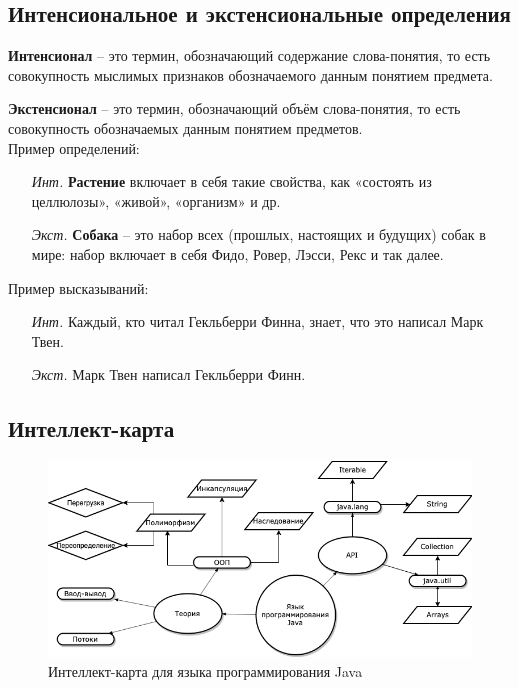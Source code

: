 \subsection{Интенсиональное и экстенсиональные определения}

\textbf{Интенсионал} -- это термин, обозначающий содержание слова-понятия, то есть совокупность мыслимых признаков обозначаемого данным понятием предмета. 

\textbf{Экстенсионал} -- это термин, обозначающий объём слова-понятия, то есть совокупность обозначаемых данным понятием предметов.\\

Пример определений:
\begin{itemize}
	\item[\emph{Инт.}] \textbf{Растение} включает в себя такие свойства, как «состоять из целлюлозы», «живой», «организм» и др. \cite{intension}
	\item[\emph{Экст.}]  \textbf{Собака} -- это набор всех (прошлых, настоящих и будущих) собак в мире: набор включает в себя Фидо, Ровер, Лэсси, Рекс и так далее. \cite{extension} \\
\end{itemize}

Пример высказываний:
\begin{itemize}
	\item[\emph{Инт.}] Каждый, кто читал Гекльберри Финна, знает, что это написал Марк Твен.
	\item[\emph{Экст.}] Марк Твен написал Гекльберри Финн.
\end{itemize}

\subsection{Интеллект-карта}

\begin{figure}[H]
	\centering
	\includegraphics[width=\linewidth]{java.png}
	\caption{Интеллект-карта для языка программирования Java}
	\label{fig:my_label}
\end{figure}

